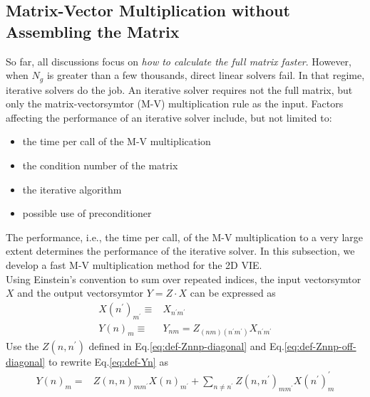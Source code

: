 \documentclass [10pt,letterpaper]{article}
\begin{document}
\subsection{Matrix-Vector Multiplication without Assembling the Matrix}
\label{sub:matrix-vectorsymtor-multiplication-without-assembling-the-matrix}
So far, all discussions focus on \emph{how to calculate the full matrix faster}.
However, when $N_g$ is greater than a few thousands, direct linear solvers fail. 
In that regime, iterative solvers do the job. 
An iterative solver requires not the full matrix, but only the matrix-vectorsymtor (M-V) multiplication rule as the input. 
Factors affecting the performance of an iterative solver include, but not limited to:
\begin{itemize}
	\item the time per call of the M-V multiplication
	\item the condition number of the matrix
	\item the iterative algorithm
	\item possible use of preconditioner
\end{itemize}
The performance, i.e., the time per call, of the M-V multiplication to a very large extent determines the performance of the iterative solver.  
In this subsection, we develop a fast M-V multiplication method for the 2D VIE.
\\
Using Einstein's convention to sum over repeated indices, the input vectorsymtor $X$ and the output vectorsymtor $Y=Z\cdot X$ can be expressed as
\begin{subequations} %
	\begin{align}
		X(n^\prime)_{m^\prime}
		\equiv
		&
		X_{n^\prime m^\prime}
		\label{eq:def-Xn}
		\\
		Y(n)_{m}
		\equiv
		&
		Y_{n m}
		=
		Z_{(n m)(n^\prime m^\prime)}
		X_{n^\prime m^\prime}
		\label{eq:def-Yn}
	\end{align}
\end{subequations}
Use the $Z(n,n^\prime)$ defined in Eq.\eqref{eq:def-Znnp-diagonal} and Eq.\eqref{eq:def-Znnp-off-diagonal} to rewrite Eq.\eqref{eq:def-Yn} as
\begin{equation} \label{eq:def-Yn-2}
	\begin{split}
		Y(n)_m
		=& 
		Z(n,n)_{m m^\prime}
		X(n)_{m^\prime}
		+
		\sum\nolimits_{n\neq n^\prime}
		Z(n,n^\prime)_{m m^\prime}
		X(n^\prime)_m^\prime
	\end{split}
\end{equation}
\end{document}

